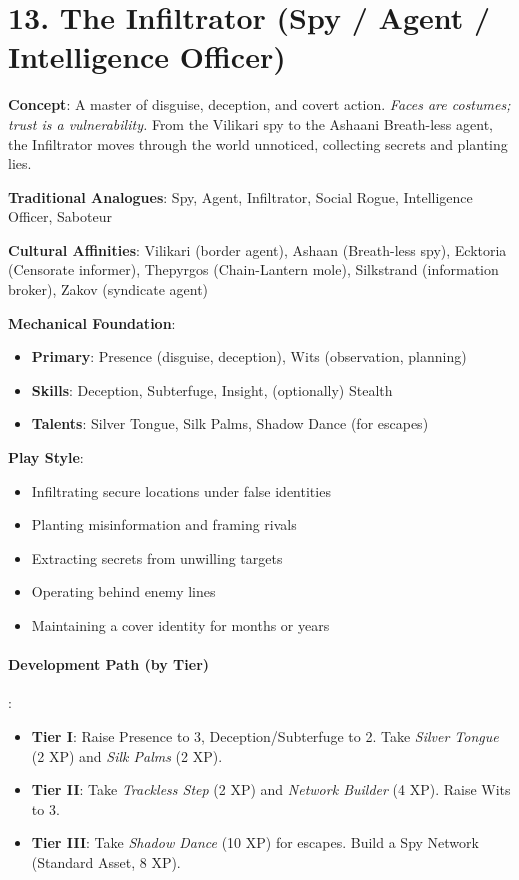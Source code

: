 \section{13. The Infiltrator (Spy / Agent / Intelligence Officer)}
\label{sec:concept-infiltrator}

\textbf{Concept}: A master of disguise, deception, and covert action. \emph{Faces are costumes; trust is a vulnerability.} From the Vilikari spy to the Ashaani Breath-less agent, the Infiltrator moves through the world unnoticed, collecting secrets and planting lies.

\textbf{Traditional Analogues}: Spy, Agent, Infiltrator, Social Rogue, Intelligence Officer, Saboteur

\textbf{Cultural Affinities}: Vilikari (border agent), Ashaan (Breath-less spy), Ecktoria (Censorate informer), Thepyrgos (Chain-Lantern mole), Silkstrand (information broker), Zakov (syndicate agent)

\textbf{Mechanical Foundation}:
\begin{itemize}
\item \textbf{Primary}: Presence (disguise, deception), Wits (observation, planning)
\item \textbf{Skills}: Deception, Subterfuge, Insight, (optionally) Stealth
\item \textbf{Talents}: Silver Tongue, Silk Palms, Shadow Dance (for escapes)
\end{itemize}

\textbf{Play Style}:
\begin{itemize}
\item Infiltrating secure locations under false identities
\item Planting misinformation and framing rivals
\item Extracting secrets from unwilling targets
\item Operating behind enemy lines
\item Maintaining a cover identity for months or years
\end{itemize}

\paragraph{Development Path (by Tier)}:
\begin{itemize}
\item \textbf{Tier I}: Raise Presence to 3, Deception/Subterfuge to 2. Take \emph{Silver Tongue} (2 XP) and \emph{Silk Palms} (2 XP).
\item \textbf{Tier II}: Take \emph{Trackless Step} (2 XP) and \emph{Network Builder} (4 XP). Raise Wits to 3.
\item \textbf{Tier III}: Take \emph{Shadow Dance} (10 XP) for escapes. Build a Spy Network (Standard Asset, 8 XP).
\end{itemize}

